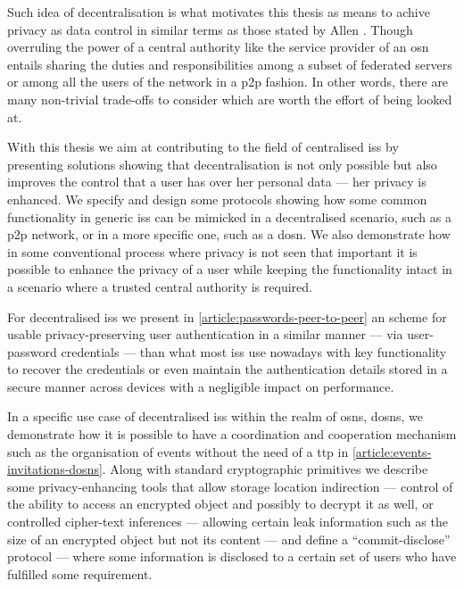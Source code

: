 \documentclass[showtrims, oldfontcommands]{kthesis}
\begin{document}
Such idea of decentralisation is what motivates this thesis as means to achive 
privacy as data control in similar terms as those stated by Allen \cite{Allen99}. 
Though overruling the power of a central authority like the service provider of 
an \ac{osn} entails sharing the duties and responsibilities among a subset of federated 
servers or among all the users of the network in a \ac{p2p} fashion. In other words, 
there are many non-trivial trade-offs to consider which are worth the effort of 
being looked at.

With this thesis we aim at contributing to the field of centralised \acp{is} by 
presenting solutions showing that decentralisation is not only possible but also 
improves the control that a user has over her personal data --- her privacy is enhanced. 
We specify and design some protocols showing how some common functionality in 
generic \acp{is} can be mimicked in a decentralised scenario, such as a \ac{p2p} 
network, or in a more specific one, such as a \ac{dosn}. We also demonstrate how 
in some conventional process where privacy is not seen that important it is possible 
to enhance the privacy of a user while keeping the functionality intact in a scenario 
where a trusted central authority is required.

For decentralised \acp{is} we present in \cref{article:passwords-peer-to-peer} an 
scheme for usable privacy-preserving user authentication in a similar manner --- 
via user-password credentials --- than what most \acp{is} use nowadays with key 
functionality to recover the credentials or even maintain the authentication details 
stored in a secure manner across devices with a negligible impact on performance.

In a specific use case of decentralised \acp{is} within the realm of \acp{osn}, 
\acp{dosn}, we demonstrate how it is possible to have a coordination and cooperation 
mechanism such as the organisation of events without the need of a \ac{ttp} in \cref{article:events-invitations-dosns}. 
Along with standard cryptographic primitives we describe some privacy-enhancing 
tools that allow storage location indirection --- control of the ability to access 
an encrypted object and possibly to decrypt it as well, or controlled cipher-text 
inferences --- allowing certain leak information such as the size of an encrypted 
object but not its content --- and define a ``commit-disclose'' protocol --- where 
some information is disclosed to a certain set of users who have fulfilled some 
requirement.
\end{document}
